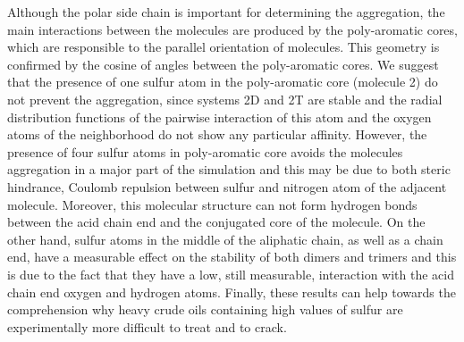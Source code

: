 Although the polar side chain is important for determining the aggregation, the main interactions between the molecules are produced by the poly-aromatic cores, which are responsible to the parallel orientation of molecules. This geometry is confirmed by the cosine of angles between the poly-aromatic cores. 
We suggest that the presence of one sulfur atom in the poly-aromatic core (molecule 2) do not prevent the aggregation, since systems 2D and 2T are stable and the radial distribution functions of the pairwise interaction of this atom and the oxygen atoms of the neighborhood do not show any particular affinity. However, the presence of four sulfur atoms in poly-aromatic core avoids the molecules aggregation in a major part of the simulation and this may be due to both steric hindrance, Coulomb repulsion between sulfur and nitrogen atom of the adjacent molecule. Moreover, this molecular structure can not form hydrogen bonds between the acid chain end and the conjugated core of the molecule. On the other hand, sulfur atoms in the middle of the aliphatic chain, as well as a chain end, have a measurable effect on the stability of both dimers and trimers and this is due to the fact that they have a low, still measurable, interaction with the acid chain end oxygen and hydrogen atoms. Finally, these results can help towards the comprehension why heavy crude oils containing high values of sulfur are experimentally more difficult to treat and to crack.\\

